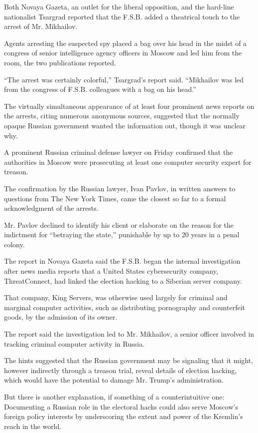 Both Novaya Gazeta, an outlet for the liberal opposition, and the
hard-line nationalist Tsargrad reported that the F.S.B. added a
theatrical touch to the arrest of Mr. Mikhailov.

Agents arresting the suspected spy placed a bag over his head in the
midst of a congress of senior intelligence agency officers in Moscow and
led him from the room, the two publications reported.

``The arrest was certainly colorful,'' Tsargrad's report said.
``Mikhailov was led from the congress of F.S.B. colleagues with a bag on
his head.''

The virtually simultaneous appearance of at least four prominent news
reports on the arrests, citing numerous anonymous sources, suggested
that the normally opaque Russian government wanted the information out,
though it was unclear why.

A prominent Russian criminal defense lawyer on Friday confirmed that the
authorities in Moscow were prosecuting at least one computer security
expert for treason.

The confirmation by the Russian lawyer, Ivan Pavlov, in written answers
to questions from The New York Times, came the closest so far to a
formal acknowledgment of the arrests.

Mr. Pavlov declined to identify his client or elaborate on the reason
for the indictment for ``betraying the state,'' punishable by up to 20
years in a penal colony.

The report in Novaya Gazeta said the F.S.B. began the internal
investigation after news media reports that a United States
cybersecurity company, ThreatConnect, had linked the election hacking to
a Siberian server company.

That company, King Servers, was otherwise used largely for criminal and
marginal computer activities, such as distributing pornography and
counterfeit goods, by the admission of its owner.

The report said the investigation led to Mr. Mikhailov, a senior officer
involved in tracking criminal computer activity in Russia.

The hints suggested that the Russian government may be signaling that it
might, however indirectly through a treason trial, reveal details of
election hacking, which would have the potential to damage Mr. Trump's
administration.

But there is another explanation, if something of a counterintuitive
one: Documenting a Russian role in the electoral hacks could also serve
Moscow's foreign policy interests by underscoring the extent and power
of the Kremlin's reach in the world.

